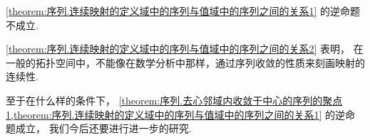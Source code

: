 \begin{proposition}\label{theorem:序列.连续映射的定义域中的序列与值域中的序列之间的关系2}
\cref{theorem:序列.连续映射的定义域中的序列与值域中的序列之间的关系1} 的逆命题不成立.
\end{proposition}

\cref{theorem:序列.连续映射的定义域中的序列与值域中的序列之间的关系2} 表明，
在一般的拓扑空间中，不能像在数学分析中那样，通过序列收敛的性质来刻画映射的连续性.

至于在什么样的条件下，
\cref{theorem:序列.去心邻域内收敛于中心的序列的聚点1,theorem:序列.连续映射的定义域中的序列与值域中的序列之间的关系1} 的逆命题成立，
我们今后还要进行进一步的研究.
